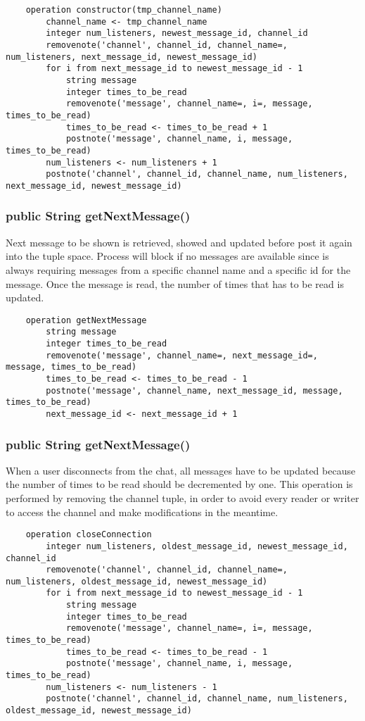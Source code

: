 \documentclass[10pt,a4paper]{article}
\begin{document}
\begin{verbatim}	
	operation constructor(tmp_channel_name)
		channel_name <- tmp_channel_name
		integer num_listeners, newest_message_id, channel_id
		removenote('channel', channel_id, channel_name=, num_listeners, next_message_id, newest_message_id)
		for i from next_message_id to newest_message_id - 1
			string message
			integer times_to_be_read
			removenote('message', channel_name=, i=, message, times_to_be_read)
			times_to_be_read <- times_to_be_read + 1
			postnote('message', channel_name, i, message, times_to_be_read)
		num_listeners <- num_listeners + 1
		postnote('channel', channel_id, channel_name, num_listeners, next_message_id, newest_message_id)
\end{verbatim}

\subsubsection{public String getNextMessage()}

Next message to be shown is retrieved, showed and updated before post it again into the tuple space. Process will block if no messages are available since is always requiring messages from a specific channel name and a specific id for the message.
Once the message is read, the number of times that has to be read is updated.

\begin{verbatim}
	operation getNextMessage
		string message
		integer times_to_be_read
		removenote('message', channel_name=, next_message_id=, message, times_to_be_read)
		times_to_be_read <- times_to_be_read - 1
		postnote('message', channel_name, next_message_id, message, times_to_be_read)
		next_message_id <- next_message_id + 1
\end{verbatim}

\subsubsection{public String getNextMessage()}

When a user disconnects from the chat, all messages have to be updated because the number of times to be read should be decremented by one. This operation is performed by removing the channel tuple, in order to avoid every reader or writer to access the channel and make modifications in the meantime.

\begin{verbatim}
	operation closeConnection
		integer num_listeners, oldest_message_id, newest_message_id, channel_id
		removenote('channel', channel_id, channel_name=, num_listeners, oldest_message_id, newest_message_id)
		for i from next_message_id to newest_message_id - 1
			string message
			integer times_to_be_read
			removenote('message', channel_name=, i=, message, times_to_be_read)
			times_to_be_read <- times_to_be_read - 1
			postnote('message', channel_name, i, message, times_to_be_read)
		num_listeners <- num_listeners - 1
		postnote('channel', channel_id, channel_name, num_listeners, oldest_message_id, newest_message_id)
\end{verbatim}
\end{document}
